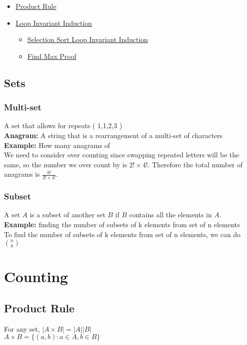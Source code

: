 \documentclass{article}
\begin{document}
\begin{spacing}{1.5}
\begin{enumerate}
\begin{itemize}
\begin{itemize}
    \end{itemize}
    \item \hyperref[sec:rproduct]{Product Rule}
    \item \hyperref[sec:invariant]{Loop Invariant Induction}
    \begin{itemize}
        \item \hyperref[sec:selectionsortproof]{Selection Sort Loop Invariant Induction}
        \item \hyperref[sec:findmaxproof]{Find Max Proof}
    \end{itemize}
\end{itemize}
\end{enumerate}
\newpage
\subsection{Sets}
\label{sec:sets}
%
\subsubsection{Multi-set}
\label{sec:multiset}
A set that allows for repeats ( {1,1,2,3} )\\
\textbf{Anagram:} A string that is a rearrangement of a multi-set of characters\\
\textbf{Example:} How many anagrams of \text{\color{red}{A}\color{green}{EE}\color{blue}{SSSS}\color{orange}{R}}\\
We need to consider over counting since swapping repeated letters will be the same, so the number we over count by is $2! \times 4!$. Therefore the total number of anagrams is $\frac{8!}{2! \times 4!}$.
%
\subsubsection{Subset}
\label{sec:subset}
A set $A$ is a subset of another set $B$ if $B$ contains all the elements in $A$.\\
\textbf{Example:} finding the number of subsets of k elements from set of n elements\\
To find the number of subsets of k elements from set of n elements, we can do $\binom{n}{k}$
\section{Counting}
\label{sec:counting}
%
\subsection{Product Rule}
For any set, $|A \times B| = |A||B|$\\
$A \times B = \{(a,b): a\in A, b\in B\}$
\label{sec:product}
%

\end{spacing}
\end{document}
